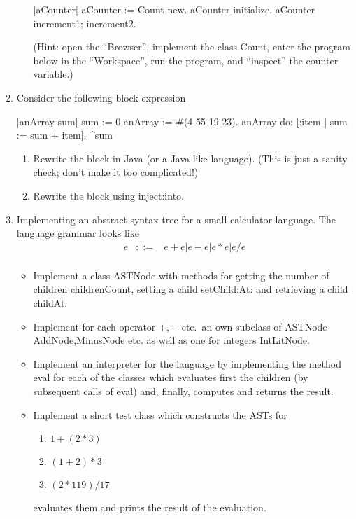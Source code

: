 \documentclass{article}
\begin{document}
\begin{enumerate}
\begin{enumerate}
\begin{java}
|aCounter|
aCounter := Count new.
aCounter initialize.
aCounter increment1; increment2.
\end{java}
(Hint: open the ``Browser'', implement the class \textsf{Count}, enter the
 program below in 
the ``Workspace'',
run the program, and ``inspect'' the counter variable.)
\end{enumerate}
\item Consider the following block expression
\begin{java}
|anArray sum|
sum := 0
anArray := #(4 55 19 23).
anArray do: [:item | sum := sum + item].
^sum
\end{java}
\begin{enumerate}
\item Rewrite the block in Java (or a Java-like language). (This is just
a sanity check; don't make it too complicated!)
\item Rewrite the block using \textsf{inject:into}.
\end{enumerate}
\item Implementing an abstract syntax tree for a small calculator
  language. The language grammar looks like
  $$\begin{array}{lcl}
    e & ::= & e + e | e - e | e * e | e / e \\
  \end{array}$$
  \begin{itemize}
    \item Implement a class \textsf{ASTNode} with methods for getting
      the number of children \textsf{childrenCount}, setting a child
      \textsf{setChild:At:} and retrieving a child \textsf{childAt:}
   \item Implement for each operator $+,-$ etc.\ an own subclass of
      ASTNode \textsf{AddNode},\textsf{MinusNode} etc. as well as one
      for integers \textsf{IntLitNode}. 
    \item Implement an interpreter for the language by implementing
      the method \textsf{eval} for each of the classes which evaluates
      first the children (by subsequent calls of \textsf{eval}) and,
      finally, computes and returns the result.
    \item Implement a short test class which constructs the ASTs for 
      \begin{enumerate}
        \item $1 + (2 * 3)$
        \item $(1 + 2) * 3$
        \item $(2 * 119) / 17$
     \end{enumerate}
     evaluates them and prints the result of the evaluation.
  \end{itemize}
\end{enumerate}
\end{document}
